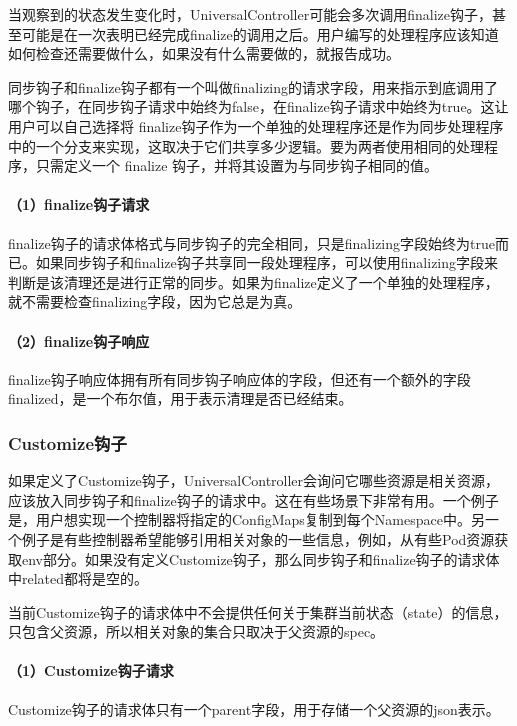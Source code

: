 \documentclass[macfonts,master]{njuthesis}
\begin{document}
当观察到的状态发生变化时，UniversalController可能会多次调用finalize钩子，甚至可能是在一次表明已经完成finalize的调用之后。用户编写的处理程序应该知道如何检查还需要做什么，如果没有什么需要做的，就报告成功。

同步钩子和finalize钩子都有一个叫做finalizing的请求字段，用来指示到底调用了哪个钩子，在同步钩子请求中始终为false，在finalize钩子请求中始终为true。这让用户可以自己选择将 finalize钩子作为一个单独的处理程序还是作为同步处理程序中的一个分支来实现，这取决于它们共享多少逻辑。要为两者使用相同的处理程序，只需定义一个 finalize 钩子，并将其设置为与同步钩子相同的值。

\paragraph{（1）finalize钩子请求}
finalize钩子的请求体格式与同步钩子的完全相同，只是finalizing字段始终为true而已。如果同步钩子和finalize钩子共享同一段处理程序，可以使用finalizing字段来判断是该清理还是进行正常的同步。如果为finalize定义了一个单独的处理程序，就不需要检查finalizing字段，因为它总是为真。

\paragraph{（2）finalize钩子响应}
finalize钩子响应体拥有所有同步钩子响应体的字段，但还有一个额外的字段finalized，是一个布尔值，用于表示清理是否已经结束。

\subsubsection{Customize钩子}

如果定义了Customize钩子，UniversalController会询问它哪些资源是相关资源，应该放入同步钩子和finalize钩子的请求中。这在有些场景下非常有用。一个例子是，用户想实现一个控制器将指定的ConfigMaps复制到每个Namespace中。另一个例子是有些控制器希望能够引用相关对象的一些信息，例如，从有些Pod资源获取env部分。如果没有定义Customize钩子，那么同步钩子和finalize钩子的请求体中related都将是空的。

当前Customize钩子的请求体中不会提供任何关于集群当前状态（state）的信息，只包含父资源，所以相关对象的集合只取决于父资源的spec。
\paragraph{（1）Customize钩子请求}
Customize钩子的请求体只有一个parent字段，用于存储一个父资源的json表示。
\end{document}
